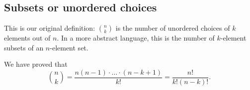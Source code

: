 \subsection{Subsets or unordered choices}
This is our original definition: $\binom{n}{k}$ is the number of unordered choices of $k$ elements out of $n$.
In a more abstract language, this is the number of $k$-element subsets of an $n$-element set.

We have proved that
\begin{equation}
\label{eqn:NChooseK}
\binom{n}{k} = \frac{n(n-1)\cdot \ldots \cdot (n-k+1)}{k!} = \frac{n!}{k!(n-k)!}.
\end{equation}
